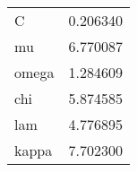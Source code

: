 \begin{tabular}{ll}
C & 0.206340\\
mu & 6.770087\\
omega & 1.284609\\
chi & 5.874585\\
lam & 4.776895\\
kappa & 7.702300\\
\end{tabular}
